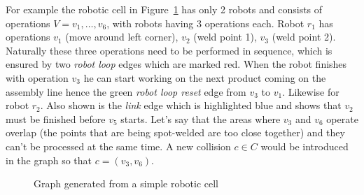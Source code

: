 For example the robotic cell in Figure~\ref{fig:examplegraph} has only 2 robots and consists of operations $V = v_1, \dots, v_6$, with robots having 3 operations each. 
Robot $r_1$ has operations $v_1$ (move around left corner), $v_2$ (weld point 1), $v_3$ (weld point 2). 
Naturally these three operations need to be performed in sequence, which is ensured by two  \emph{robot loop} edges which are marked red. 
When the robot finishes with operation $v_3$ he can start working on the next product coming on the assembly line hence the green \emph{robot loop reset} edge from $v_3$ to $v_1$.
Likewise for robot $r_2$. 
Also shown is the \emph{link} edge which is highlighted blue and shows that $v_2$ must be finished before $v_5$ starts.
Let's say that the areas where $v_3$ and $v_6$ operate overlap (the points that are being spot-welded are too close together) and they can't be processed at the same time. 
A new collision $c \in C$ would be introduced in the graph so that $c = (v_3, v_6)$.

\begin{figure}[H]
    \centering
    
    \caption{Graph generated from a simple robotic cell}
    \label{fig:examplegraph}
\end{figure}
